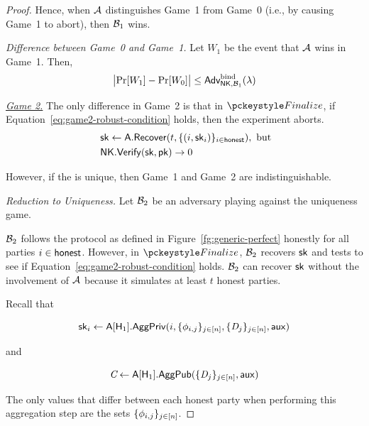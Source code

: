 \begin{proof}
Hence, when $\mathcal{A}$ distinguishes Game~1 from Game~0 (i.e., by causing Game~1 to abort),
then $\mathcal{B}_1$ wins.

\medskip

\noindent \textit{Difference between Game~0 and Game~1.}
Let $W_1$ be the event that $\mathcal{A}$ wins in Game~1. Then,
\begin{equation} \label{eq:game1-robust}
  \bigl|  \Pr[W_1] - \Pr[W_0]   \bigr| \leq \textsf{\upshape Adv}^{\textrm{\upshape bind}}_{\mathsf{NK},\mathcal{B}_1}(\lambda)
\end{equation}

\medskip


\noindent \textit{\underline{Game 2.}}
The only difference in Game~2 is that in $\finalize$,
if Equation~\ref{eq:game2-robust-condition} holds,
then the experiment aborts.
\begin{align} \label{eq:game2-robust-condition}
  \begin{split}
    &\ \mathsf{sk} \gets \mathsf{A}.\mathsf{Recover}(t, \{(i, \mathsf{sk}_i) \}_{i \in \mathsf{honest}}), \text{ but} \\
    &\ \mathsf{NK}.\mathsf{Verify}(\mathsf{sk}, \mathsf{pk}) \rightarrow 0
  \end{split}
\end{align}

However, if the \AVSS is unique, then Game~1 and Game~2 are indistinguishable.

\medskip

\noindent \textit{Reduction to \AVSS Uniqueness.}
Let $\mathcal{B}_2$ be an adversary playing against the \AVSS uniqueness game.

$\mathcal{B}_2$ follows the protocol as defined in Figure~\ref{fg:generic-perfect} honestly for all parties $i \in \mathsf{honest}$.
However, in $\finalize$, $\mathcal{B}_2$ recovers $\mathsf{sk}$ and tests to see if Equation~\ref{eq:game2-robust-condition} holds.
$\mathcal{B}_2$ can recover $\mathsf{sk}$ without the involvement of $\mathcal{A}$ because it simulates at least $t$ honest parties.

Recall that

\[
\mathsf{sk}_i \gets \mathsf{A}[\mathsf{H}_1].\mathsf{AggPriv}(i, \{\phi_{i,j} \}_{j \in [n]}, \{ \textit{D}_j \}_{j \in [n]}, \mathsf{aux})
\]

and

\[
\textit{C} \gets \mathsf{A}[\mathsf{H}_1].\mathsf{AggPub}(\{ \textit{D}_j \}_{j \in [n]}, \mathsf{aux})
\]

The only values that differ between each honest party when performing this aggregation step are the sets $\{\phi_{i,j} \}_{j \in [n]}$.


\end{proof}
